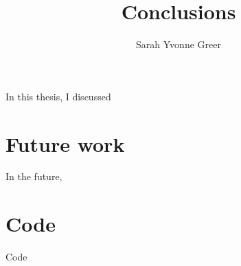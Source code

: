 \title{Conclusions}
\author{Sarah Yvonne Greer}
\label{ch:chapter-conclusion}

\maketitle


In this thesis, I discussed 


\section{Future work}
In the future, 

\appendix
\section{Code}
Code